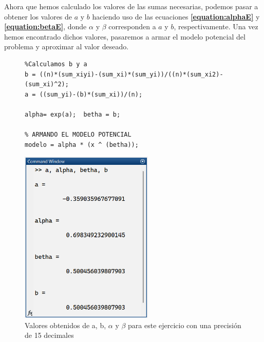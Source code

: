 \documentclass[11pt,letterpaper]{article}
\begin{document}
Ahora que hemos calculado los valores de las sumas necesarias, podemos pasar a obtener los valores de $a$ y $b$ haciendo uso de las ecuaciones \textbf{\ref{equation:alphaE}} y \textbf{\ref{equation:betaE}}, donde $\alpha$ y $\beta$ corresponden a $a$ y $b$, respectivamente. Una vez hemos encontrado dichos valores, pasaremos a armar el modelo potencial del problema y aproximar al valor deseado.

\begin{figure}[H]
\begin{tcolorbox}[title = Problema 2: Calculando los valores de a y b]
\begin{verbatim}
%Calculamos b y a
b = ((n)*(sum_xiyi)-(sum_xi)*(sum_yi))/((n)*(sum_xi2)-(sum_xi)^2);
a = ((sum_yi)-(b)*(sum_xi))/(n);

alpha= exp(a); 	betha = b;

% ARMANDO EL MODELO POTENCIAL
modelo = alpha * (x ^ (betha));
\end{verbatim}
\end{tcolorbox}
\end{figure}
\begin{figure}[H]
\centering
\includegraphics[width=2.5in]{ab2.png}
\caption{Valores obtenidos de a, b, $\alpha$ y $\beta$ para este ejercicio con una precisión de 15 decimales}
\label{figure:ab2}
\end{figure}
\end{document}
